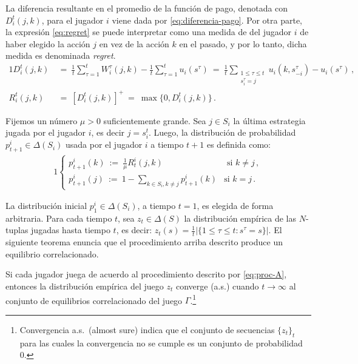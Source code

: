 La diferencia resultante en el promedio de la función de pago, denotada con $D_i^t(j, k)$, para el jugador $i$ viene dada por \eqref{eq:diferencia-pago}. Por otra parte, la expresión \eqref{eq:regret} se puede interpretar como una medida de  del jugador $i$ de haber elegido la acción $j$ en vez de la acción $k$ en el pasado, y por lo tanto, dicha medida es denominada \textit{regret}.
\begin{alignat}{1}
\label{eq:diferencia-pago}
  D_i^t(j, k)\ 
    &=\ \frac{1}{t} \sum_{\tau = 1}^{t} W_i^{\tau}(j, k) - \frac{1}{t} \sum_{\tau = 1}^{t} u_i(s^{\tau})\ 
	=\ \frac{1}{t} \sum_{\substack{1\leq \tau \leq t \\s^\tau_i = j}} u_i(k, s_{-i}^{\tau}) - u_i(s^{\tau})\,, \\
\label{eq:regret}
R_i^t(j, k)\ &=\ [D_i^t(j, k)]^+\ =\ \max\{0, D_i^t(j, k)\} \,.
\end{alignat}

Fijemos un número $\mu > 0$ suficientemente grande. Sea $j \in S_i$ la última estrategia jugada por el jugador $i$, es decir $j = s_i^t$. Luego, la distribución de probabilidad $p_{t+1}^i \in \Delta(S_i)$ usada por el jugador $i$ a tiempo $t+1$ es definida como:
\begin{alignat}{1}
\label{eq:proc-A}
  \begin{cases}
    p_{t+1}^i(k)\ :=\  \frac{1}{\mu} R_t^i(j, k) & \text{ si $k \neq j$} \,, \\
    p_{t+1}^i(j)\ :=\ 1 - \sum_{k \in S_i, k \neq j} p_{t+1}^i(k) & \text{si $k=j$} \,.
  \end{cases}
\end{alignat}

La distribución inicial $p_{1}^i \in \Delta(S_i)$, a tiempo $t=1$, es elegida de forma arbitraria. Para cada tiempo $t$, sea $z_t \in \Delta(S)$ la distribución empírica de las $N$-tuplas jugadas hasta tiempo $t$, es decir:
$z_t(s) = \frac{1}{t} |\{1\leq\tau \leq t : s^{\tau} = s \}|$. El siguiente teorema enuncia que el procedimiento arriba descrito produce un equilibrio correlacionado.

\begin{theorem}
\label{theo:conv-proc-A}
Si cada jugador juega de acuerdo al procedimiento descrito por \eqref{eq:proc-A}, entonces la distribución empírica del juego $z_t$ converge (a.s.) cuando $t \rightarrow \infty$ al conjunto de equilibrios correlacionado del juego $\Gamma$.\footnote{Convergencia a.s.\ (almost sure) indica que el conjunto de  secuencias $\{z_t\}_t$ para las cuales la convergencia no se cumple es un conjunto de probabilidad 0.}
\end{theorem}

